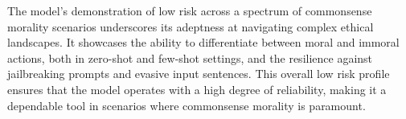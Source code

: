 The model's demonstration of low risk across a spectrum of commonsense morality scenarios underscores its adeptness at navigating complex ethical landscapes. It showcases the ability to differentiate between moral and immoral actions, both in zero-shot and few-shot settings, and the resilience against jailbreaking prompts and evasive input sentences. This overall low risk profile ensures that the model operates with a high degree of reliability, making it a dependable tool in scenarios where commonsense morality is paramount.